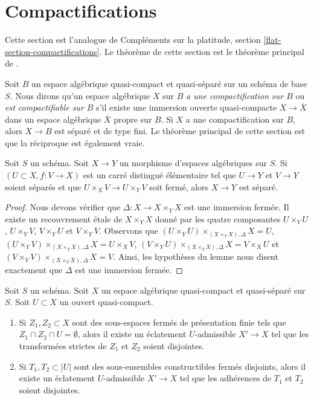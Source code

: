 \section{Compactifications}
\label{section-compactifications}

\noindent
Cette section est l'analogue de Compléments sur la platitude, section
\ref{flat-section-compactifications}. Le théorème de cette
section est le théorème principal de \cite{CLO}.

\medskip\noindent
Soit $B$ un espace algébrique quasi-compact et quasi-séparé sur un schéma de base $S$. Nous dirons qu'un espace algébrique $X$ sur $B$ {\it a une compactification sur $B$} ou {\it est compactifiable sur $B$} s'il existe une immersion ouverte quasi-compacte $X \to \overline{X}$ dans un espace algébrique $\overline{X}$ propre sur $B$. Si $X$ a une compactification sur $B$, alors $X \to B$ est séparé et de type fini. Le théorème principal de cette section est que la réciproque est également vraie.

\begin{lemma}
\label{lemma-check-separated}
Soit $S$ un schéma. Soit $X \to Y$ un morphisme d'espaces algébriques sur $S$.
Si $(U \subset X, f : V \to X)$ est un carré distingué élémentaire
tel que $U \to Y$ et $V \to Y$ soient séparés et que
$U \times_X V \to U \times_Y V$ soit fermé, alors $X \to Y$ est séparé.
\end{lemma}

\begin{proof}
Nous devons vérifier que $\Delta : X \to X \times_Y X$ est une immersion fermée.
Il existe un recouvrement \'etale de $X \times_Y X$ donné par les quatre composantes
$U \times_Y U$, $U \times_Y V$, $V \times_Y U$ et $V \times_Y V$.
Observons que
$(U \times_Y U) \times_{(X \times_Y X), \Delta} X  = U$,
$(U \times_Y V) \times_{(X \times_Y X), \Delta} X = U \times_X V$,
$(V \times_Y U) \times_{(X \times_Y X), \Delta} X = V \times_X U$ et
$(V \times_Y V) \times_{(X \times_Y X), \Delta} X = V$.
Ainsi, les hypothèses du lemme
nous disent exactement que $\Delta$ est une immersion fermée.
\end{proof}

\begin{lemma}
\label{lemma-separate-disjoint-locally-closed-by-blowing-up}
Soit $S$ un schéma.
Soit $X$ un espace algébrique quasi-compact et quasi-séparé sur $S$.
Soit $U \subset X$ un ouvert quasi-compact.
\begin{enumerate}
\item Si $Z_1, Z_2 \subset X$ sont des sous-espaces fermés de présentation finie tels que $Z_1 \cap Z_2 \cap U = \emptyset$, alors
il existe un éclatement $U$-admissible $X' \to X$
tel que les transformées strictes de $Z_1$ et $Z_2$ soient disjointes.
\item Si $T_1, T_2 \subset |U|$ sont des sous-ensembles constructibles fermés disjoints, alors il existe un éclatement $U$-admissible $X' \to X$
tel que les adhérences de $T_1$ et $T_2$ soient disjointes.
\end{enumerate}
\end{lemma}

